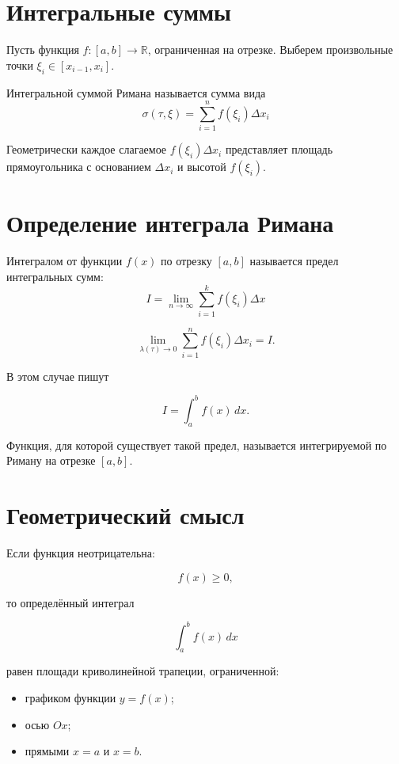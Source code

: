 \documentclass[14pt]{extreport}
\begin{document}
\section{Интегральные суммы}

Пусть функция $f:[a,b]\to\mathbb R$,
ограниченная на отрезке.
Выберем произвольные точки $\xi_i\in[x_{i-1},x_i].$

\begin{definition}
Интегральной суммой Римана называется сумма вида
\[
\sigma(\tau,\xi)
=
\sum_{i=1}^{n}
f(\xi_i)\Delta x_i
\]
\end{definition}

Геометрически каждое слагаемое $f(\xi_i)\Delta x_i$
представляет площадь прямоугольника с основанием
$\Delta x_i$ и высотой $f(\xi_i)$.

\section{Определение интеграла Римана}

\begin{definition}
Интегралом от функции $f(x)$ по отрезку $
[a, b]$ называется предел интегральных сумм:
$$
I = \lim_{n \to \infty} \sum_{i=1}^k f(\xi_i)\Delta x
$$

\[
\lim_{\lambda(\tau)\to0}
\sum_{i=1}^{n}
f(\xi_i)\Delta x_i
=
I.
\]

В этом случае пишут

\[
\boxed{
I=\int_a^b f(x)\,dx.
}
\]
\end{definition}

Функция, для которой существует такой предел,
называется интегрируемой по Риману на отрезке $[a,b]$.

\section{Геометрический смысл}

Если функция неотрицательна:

\[
f(x)\ge0,
\]

то определённый интеграл

\[
\int_a^b f(x)\,dx
\]

равен площади криволинейной трапеции,
ограниченной:

\begin{itemize}
\item графиком функции $y=f(x)$;
\item осью $Ox$;
\item прямыми $x=a$ и $x=b$.
\end{itemize}
\end{document}
